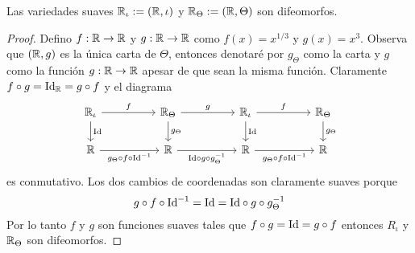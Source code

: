\begin{ejercicio}\label{ej:2}
  Las variedades suaves $\mathbb{R}_{\iota}:=(\mathbb{R},\iota)$ y $\mathbb{R}_{\Theta}:=(\mathbb{R},\Theta)$ son difeomorfos.
\end{ejercicio}

\begin{proof}%
  Defino $f:\mathbb{R}\rightarrow\mathbb{R}$ y $g:\mathbb{R}\rightarrow\mathbb{R}$ como $f(x)=x^{1/3}$ y $g(x)=x^3$. Observa que $(\mathbb{R},g)$ es la
  \'unica carta de $\Theta$, entonces denotar\'e por $g_{\Theta}$ como la carta y $g$ como la funci\'on
  $g:\mathbb{R}\rightarrow\mathbb{R}$ apesar de que sean la misma funci\'on. Claramente $f\circ g = \text{Id}_{\mathbb{R}}=g\circ f$ y
  el diagrama
  \[
    \begin{tikzcd}
      \RR_{\iota} \arrow[rr,"f"] \arrow[d,"\Id"] &&
      \RR_{\Theta} \arrow[rr,"g"] \arrow[d,"g_{\Theta}"] &&
      \RR_{\iota} \arrow[d,"\Id"] \arrow[rr,"f"]&&
      \RR_{\Theta} \arrow[d,"g_{\Theta}"]\\
      \RR \arrow[rr,"g_{\Theta}\circ f\circ \Id^{-1}"'] &&
      \RR \arrow[rr,"\Id\circ g \circ g_{\Theta}^{-1}"'] &&
      \RR \arrow[rr,"g_{\Theta}\circ f\circ \Id^{-1}"'] &&
      \RR
    \end{tikzcd}
  \]
  es conmutativo. Los dos cambios de coordenadas son claramente suaves porque
  \[
    g\circ f \circ \text{Id}^{-1}=\text{Id}=\text{Id} \circ g\circ g_{\Theta}^{-1}
  \]
  Por lo tanto $f$ y $g$ son funciones suaves tales que $f\circ g =\text{Id} = g\circ f$ entonces
  $R_{\iota}$ y $\mathbb{R}_{\Theta}$ son difeomorfos.  
\end{proof}%

